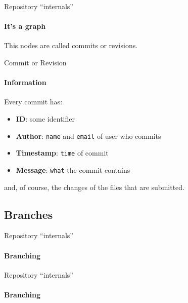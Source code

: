 \documentclass{beamer}
\begin{document}
    \begin{frame}{Repository ``internals''}
      \framesubtitle{It's a graph}%
      \begin{figure}
      		\centering
      \end{figure}
  
  This nodes are called \alert{commits} or \alert{revisions}.
    \end{frame}

    \begin{frame}{Commit or Revision}
\framesubtitle{Information}%
Every commit has:
\begin{itemize}
	\item \textbf{ID}: some identifier
	\item \textbf{Author}: \texttt{name} and \texttt{email} of user who commits
	\item \textbf{Timestamp}: \texttt{time} of commit
	\item \textbf{Message}: \texttt{what} the commit contains
\end{itemize}
and, of course, the \alert{changes} of the files that are submitted.
\end{frame}

\subsection{Branches}
\begin{frame}{Repository ``internals''}
\framesubtitle{Branching}%
\begin{figure}
	\centering
\end{figure}
\end{frame}

\begin{frame}{Repository ``internals''}
\framesubtitle{Branching}%
\begin{figure}
	\centering
\end{figure}
\end{frame}
\end{document}

